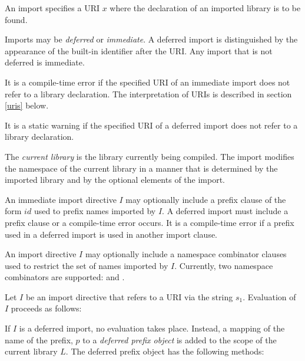 \documentclass{article}
\newcommand{\code}[1]{{\sf #1}}
\begin{document}
\LMHash{}
An import specifies a URI $x$ where the declaration of an imported library is to be found.

\LMHash{}
Imports may be {\em deferred} or {\em immediate}. A deferred import is distinguished by the appearance of the built-in identifier \DEFERRED{} after the URI. Any import that is not deferred is immediate.

\LMHash{}
It is a compile-time error if  the specified URI of an immediate import does not refer to a library declaration.  The interpretation of URIs is described in section \ref{uris} below.

\LMHash{}
It is a static warning if the specified URI of a deferred import does not refer to a library declaration.



\LMHash{}
The {\em current library} is the library currently being compiled. The import modifies the  namespace of the current library in a manner that is determined by the imported library and by the optional elements of  the import.

\LMHash{}
An immediate import directive $I$ may optionally include a prefix clause of the form \code{\AS{} $id$} used to prefix names imported by $I$. A deferred import must include a prefix clause or a compile-time error occurs. It is a compile-time error if a prefix used in a deferred import is used in another import clause.

\LMHash{}
An import directive $I$ may optionally include a namespace combinator clauses used to restrict the set of names imported by $I$. Currently, two namespace combinators are supported: \HIDE{} and \SHOW{}.

\LMHash{}
Let $I$ be an import directive that refers to a URI via the string $s_1$. Evaluation of $I$  proceeds as follows:

\LMHash{}
If $I$ is a deferred import, no evaluation takes place. Instead, a mapping of the name of the prefix, $p$ to a {\em deferred prefix object} is added to the scope of the current library $L$.
The deferred prefix object has the following methods:
\end{document}
